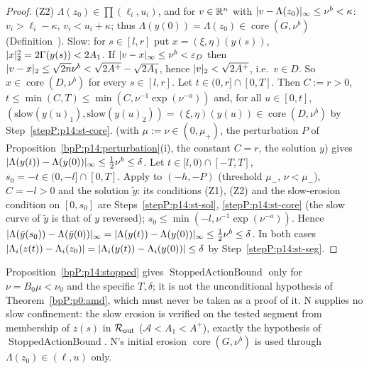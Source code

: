 \begin{proof}
\label{stepP:p14:st-core} (Z2) $\Lambda(z_0)\in\prod(\ell_i,u_i)$, and for $v\in\mathbb{R}^n$ with $\lvert v-\Lambda(z_0)\rvert_\infty\le\nu^b<\kappa$: $v_i>\ell_i-\kappa$, $v_i<u_i+\kappa$; thus $\Lambda(y(0))=\Lambda(z_0)\in\operatorname{core}(G,\nu^b)$ (Definition~). Slow: for $s\in[l,r]$ put $x=(\xi,\eta)(y(s))$, $\lvert x\rvert_2^2=2\Gamma(y(s))<2A_1$. If $\lvert v-x\rvert_\infty\le\nu^b<\varepsilon_D$ then $\lvert v-x\rvert_2\le\sqrt{2n}\nu^b<\sqrt{2A^+}-\sqrt{2A_1}$, hence $\lvert v\rvert_2<\sqrt{2A^+}$, i.e.\ $v\in D$. So $x\in\operatorname{core}(D,\nu^b)$ for every $s\in[l,r]$.
\label{stepP:p14:st-fwd} Let $t\in(0,r]\cap[0,T]$. Then $C:=r>0$, $t\le\min(C,T)\le\min(C,\nu^{-1}\exp(\nu^{-a}))$ and, for all $u\in[0,t]$, $(\mathrm{slow}(y(u)_1),\mathrm{slow}(y(u)_2))=(\xi,\eta)(y(u))\in\operatorname{core}(D,\nu^b)$ by Step~\ref{stepP:p14:st-core}.  (with $\mu:=\nu\in(0,\mu_+)$, the perturbation $P$ of Proposition~\ref{bpP:p14:perturbation}(i), the constant $C=r$, the solution $y$) gives $\lvert \Lambda(y(t))-\Lambda(y(0))\rvert_\infty\le\frac12\nu^b\le\delta$.
\label{stepP:p14:st-bwd} Let $t\in[l,0)\cap[-T,T]$, $s_0=-t\in(0,-l]\cap[0,T]$. Apply  to $(-h,-P)$ (threshold $\mu_-$, $\nu<\mu_-$), $C=-l>0$ and the solution $\tilde y$: its conditions (Z1), (Z2) and the slow-erosion condition on $[0,s_0]$ are Steps~\ref{stepP:p14:st-sol}, \ref{stepP:p14:st-core} (the slow curve of $\tilde y$ is that of $y$ reversed); $s_0\le\min(-l,\nu^{-1}\exp(\nu^{-a}))$. Hence $\lvert \Lambda(\tilde y(s_0))-\Lambda(\tilde y(0))\rvert_\infty=\lvert \Lambda(y(t))-\Lambda(y(0))\rvert_\infty\le\frac12\nu^b\le\delta$.
\label{stepP:p14:st-phys} In both cases $\lvert \Lambda_i(z(t))-\Lambda_i(z_0)\rvert=\lvert \Lambda_i(y(t))-\Lambda_i(y(0))\rvert\le\delta$ by Step~\ref{stepP:p14:st-seg}.
\end{proof}

\begin{remark}\label{bpP:p14:st-limits}
Proposition~\ref{bpP:p14:stopped} gives $\operatorname{StoppedActionBound}$ only for $\nu=B_0\mu<\nu_0$ and the specific $T,\delta$; it is not the unconditional hypothesis of Theorem~\ref{bpP:p0:amd}, which must never be taken as a proof of it. N supplies no slow confinement: the slow erosion is verified on the tested segment from membership of $z(s)$ in $\mathcal R_{\rm out}$ ($\mathcal A<A_1<A^+$), exactly the hypothesis of $\operatorname{StoppedActionBound}$. N's initial erosion $\operatorname{core}(G,\nu^b)$ is used through $\Lambda(z_0)\in(\ell,u)$ only.
\end{remark}

